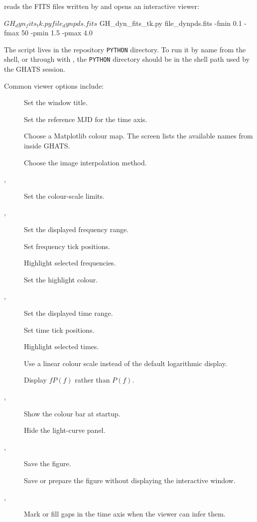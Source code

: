  reads the FITS files written by
 and opens an interactive viewer:

\begin{ghatsconsole}
$ GH_dyn_fits_tk.py file_dynpds.fits
$ GH_dyn_fits_tk.py file_dynpds.fits -fmin 0.1 -fmax 50 -pmin 1.5 -pmax 4.0
\end{ghatsconsole}

The script lives in the repository \texttt{PYTHON} directory.  To run it by
name from the shell, or through  with , the
\texttt{PYTHON} directory should be in the shell path used by the GHATS
session.

Common viewer options include:

\begin{description}
\item[] Set the window title.
\item[] Set the reference MJD for the time axis.
\item[] Choose a Matplotlib colour map.  The
   screen lists the available names from inside GHATS.
\item[] Choose the image interpolation method.
\item[, ] Set the colour-scale limits.
\item[, ] Set the displayed frequency range.
\item[] Set frequency tick positions.
\item[] Highlight selected frequencies.
\item[] Set the highlight colour.
\item[, ] Set the displayed time range.
\item[] Set time tick positions.
\item[] Highlight selected times.
\item[] Use a linear colour scale instead of the default
  logarithmic display.
\item[] Display \(fP(f)\) rather than \(P(f)\).
\item[, ] Show the colour bar at startup.
\item[] Hide the light-curve panel.
\item[, ] Save the figure.
\item[] Save or prepare the figure without displaying the
  interactive window.
\item[, ] Mark or fill gaps in the time
  axis when the viewer can infer them.
\end{description}

